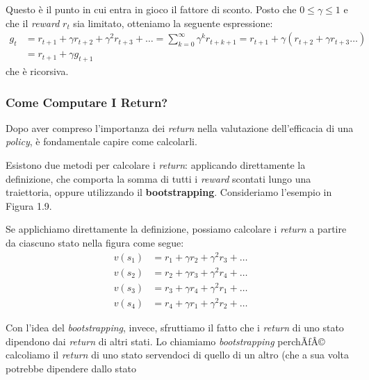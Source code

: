 ﻿\documentclass[11pt, a4paper]{report}
\begin{document}
Questo è il punto in cui entra in gioco il fattore di sconto. Posto che $0 \le \gamma \le 1$ e che il \emph{reward} $r_t$ sia limitato, otteniamo la seguente espressione:
\begin{equation}
\begin{aligned}
g_t &= r_{t+1} + \gamma r_{t+2} + \gamma^2 r_{t+3} + \dots = \sum_{k=0}^{\infty} \gamma^k r_{t+k+1} = r_{t+1} + \gamma(r_{t+2} + \gamma r_{t+3} \dots) \\
&= r_{t+1} + \gamma g_{t+1}
\end{aligned}
\end{equation}
che è ricorsiva.

\newpage


\subsubsection{Come Computare I Return?}

Dopo aver compreso l'importanza dei \emph{return} nella valutazione dell'efficacia di una \emph{policy}, è fondamentale capire come calcolarli.

Esistono due metodi per calcolare i \emph{return}: applicando direttamente la definizione, che comporta la somma di tutti i \emph{reward} scontati lungo una traiettoria, oppure utilizzando il \textbf{bootstrapping}. Consideriamo l'esempio in Figura 1.9.

Se applichiamo direttamente la definizione, possiamo calcolare i \emph{return} a partire da ciascuno stato nella figura come segue:
\begin{equation}
\begin{aligned}
v(s_1) &= r_1 + \gamma r_2 + \gamma^2 r_3 + \dots \\
v(s_2) &= r_2 + \gamma r_3 + \gamma^2 r_4 + \dots \\
v(s_3) &= r_3 + \gamma r_4 + \gamma^2 r_1 + \dots \\
v(s_4) &= r_4 + \gamma r_1 + \gamma^2 r_2 + \dots
\end{aligned}
\end{equation}

Con l'idea del \emph{bootstrapping}, invece, sfruttiamo il fatto che i \emph{return} di uno stato dipendono dai \emph{return} di altri stati. Lo chiamiamo \emph{bootstrapping} perchÃƒÂ© calcoliamo il \emph{return} di uno stato servendoci di quello di un altro (che a sua volta potrebbe dipendere dallo stato
\end{document}
